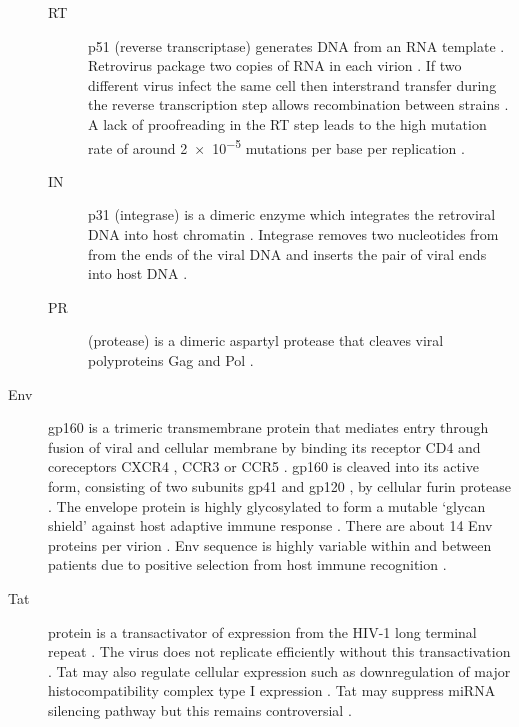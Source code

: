 \documentclass[../sherrill-Mix_thesis.tex]{subfiles}
\begin{document}
\begin{description}
			\begin{description}
				\item[RT]
					p51 (reverse transcriptase) \citep{Kohlstaedt1992} generates DNA from an RNA template \citep{Baltimore1970,Temin1970}. Retrovirus package two copies of RNA in each virion \citep{Bellamy1974,Kung1975,Kung1976}. If two different virus infect the same cell then interstrand transfer during the reverse transcription step allows recombination between strains \citep{Panganiban1988,Hu1990,Hu1990a}. A lack of proofreading in the RT step leads to the high mutation rate of around \num{2e-5} mutations per base per replication \citep{Hahn1986,Preston1988,Roberts1988,Mansky1995,Mansky1996,Abram2010,Achuthan2014}.
				\item[IN]
					p31 (integrase) is a dimeric enzyme which integrates the retroviral DNA into host chromatin \citep{Bushman1990,Engelman1991,Panganiban1984,Maertens2010,Hare2010}. Integrase removes two nucleotides from from the \threePrime{} ends of the viral DNA and inserts the pair of viral ends into host DNA \citep{Bushman1991}.
				\item[PR]
					(protease) is a dimeric aspartyl protease \citep{Wlodawer1989} that cleaves viral polyproteins Gag and Pol \citep{Kraeusslich1989,Kohl1988}. 
			\end{description}
		\item[Env]
			gp160 is a trimeric transmembrane protein that mediates entry through fusion of viral and cellular membrane by binding its receptor CD4 \citep{Dalgleish1984,Klatzmann1984,Lifson1986,Lifson1986a,Maddon1986} and coreceptors CXCR4 \citep{Feng1996}, CCR3 or CCR5 \citep{Choe1996,He1997}. gp160 is cleaved into its active form, consisting of two subunits gp41 and gp120 \citep{Veronese1985}, by cellular furin protease \citep{Hallenberger1992}. The envelope protein is highly glycosylated to form a mutable `glycan shield' against host adaptive immune response \citep{Wei2003}. There are about 14 Env proteins per virion \citep{Zhu2006}. Env sequence is highly variable within and between patients \citep{Holmes1992,Shankarappa1999} due to positive selection from host immune recognition \citep{Bonhoeffer1995,Wolinsky1996,Ross2002}. %
		\item[Tat]
			 protein is a transactivator of expression from the HIV-1 long terminal repeat \citep{Sodroski1985,Sodroski1985a,Cullen1986}. The virus does not replicate efficiently without this transactivation \citep{Dayton1986}. Tat may also regulate cellular expression such as downregulation of major histocompatibility complex type I expression \citep{Howcroft1993}.  Tat may suppress miRNA silencing pathway \citep{Bennasser2005,Triboulet2007,Qian2009} but this remains controversial \citep{Lin2007}.

\end{description}
\end{document}
